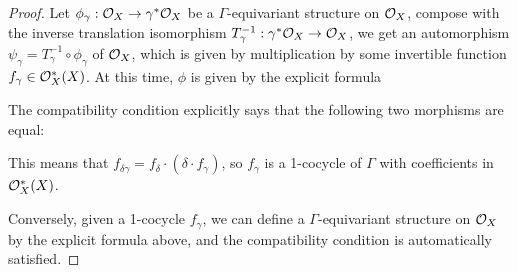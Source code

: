 \begin{proof}
  Let $\phi_{\gamma}: \mathcal{O}_X \to {\gamma}^* \mathcal{O}_X$ be a $\Gamma$-equivariant structure on $\mathcal{O}_X$, compose with the inverse translation isomorphism $T_{\gamma}^{-1}: {\gamma}^* \mathcal{O}_X \to \mathcal{O}_X$, we get an automorphism $\psi_{\gamma} = T_{\gamma}^{-1} \circ \phi_{\gamma}$ of $\mathcal{O}_X$, which is given by multiplication by some invertible function $f_{\gamma} \in \mathcal{O}^{*}_X(X)$. At this time, $\phi$ is given by the explicit formula

  The compatibility condition explicitly says that the following two morphisms are equal:

\begin{center}
\end{center}

\begin{center}
\end{center}



This means that $f_{\delta \gamma} = f_{\delta} \cdot (\delta \cdot f_{\gamma})$, so $f_{\gamma}$ is a 1-cocycle of $\Gamma$ with coefficients in $\mathcal{O}^{*}_X(X)$.

  Conversely, given a 1-cocycle $f_{\gamma}$, we can define a $\Gamma$-equivariant structure on $\mathcal{O}_X$ by the explicit formula above, and the compatibility condition is automatically satisfied.


\end{proof}
